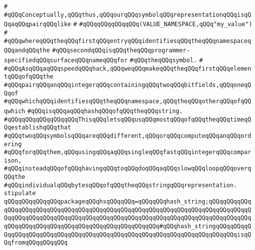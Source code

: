 \verb|#|\newline
\verb|#qQQqConceptually,qQQqthus,qQQqourqQQqsymbolqQQqrepresentationqQQqisqQQqaqQQqpairqQQqlike|\newline
\verb|#|\newline
\verb|#qQQqqQQqqQQqqQQq(VALUE_NAMESPACE,qQQq"my_value")|\newline
\verb|#|\newline
\verb|#qQQqwhereqQQqtheqQQqfirstqQQqentryqQQqidentifiesqQQqtheqQQqnamespaceqQQqandqQQqthe|\newline
\verb|#qQQqsecondqQQqisqQQqtheqQQqprogrammer-specifiedqQQqsurfaceqQQqnameqQQqfor|\newline
\verb|#qQQqtheqQQqsymbol.|\newline
\verb|#|\newline
\verb|#qQQqAsqQQqaqQQqspeedqQQqhack,qQQqweqQQqmakeqQQqtheqQQqfirstqQQqelementqQQqofqQQqthe|\newline
\verb|#qQQqpairqQQqanqQQqintegerqQQqcontainingqQQqtwoqQQqbitfields,qQQqoneqQQqof|\newline
\verb|#qQQqwhichqQQqidentifiesqQQqtheqQQqnamespace,qQQqtheqQQqotherqQQqofqQQqwhich|\newline
\verb|#qQQqisqQQqaqQQqhashqQQqofqQQqtheqQQqstring.|\newline
\verb|#qQQqqQQqqQQqqQQqqQQqThisqQQqletsqQQqusqQQqmostqQQqofqQQqtheqQQqtimeqQQqestablishqQQqthat|\newline
\verb|#qQQqtwoqQQqsymbolsqQQqareqQQqdifferent,qQQqorqQQqcomputeqQQqanqQQqordering|\newline
\verb|#qQQqforqQQqthem,qQQqusingqQQqaqQQqsingleqQQqfastqQQqintegerqQQqcomparison,|\newline
\verb|#qQQqinsteadqQQqofqQQqhavingqQQqtoqQQqdoqQQqaqQQqslowqQQqloopqQQqoverqQQqthe|\newline
\verb|#qQQqindividualqQQqbytesqQQqofqQQqtheqQQqstringqQQqrepresentation.|\newline
\newline
\newline
\verb|stipulate|\newline
\verb|qQQqqQQqqQQqqQQqpackageqQQqhsqQQqqQQq=qQQqqQQqhash_string;qQQqqQQqqQQqqQQqqQQqqQQqqQQqqQQqqQQqqQQqqQQqqQQqqQQqqQQqqQQqqQQqqQQqqQQqqQQqqQQqqQQqqQQqqQQqqQQqqQQqqQQqqQQqqQQqqQQqqQQqqQQqqQQqqQQqqQQqqQQqqQQqqQQqqQQqqQQqqQQqqQQqqQQqqQQqqQQqqQQqqQQqqQQqqQQqqQQq#qQQqhash_stringqQQqqQQqqQQqqQQqqQQqqQQqqQQqqQQqqQQqqQQqqQQqqQQqqQQqqQQqqQQqqQQqqQQqqQQqqQQqisqQQqfromqQQqqQQqqQQq|\newline
